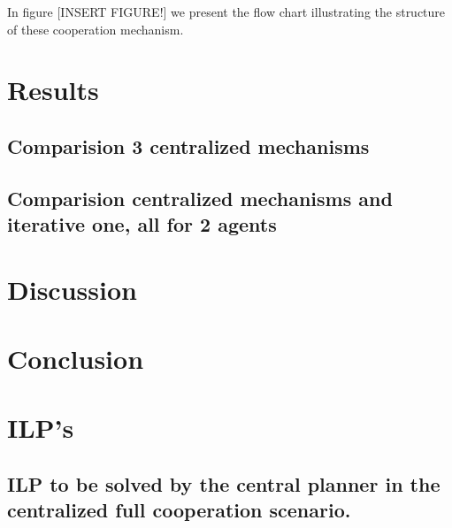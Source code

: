 \documentclass[review]{elsarticle}
\begin{document}
In figure [INSERT FIGURE!] we present the flow chart illustrating the structure of these cooperation mechanism.

\section{Results} \label{seq:results}

\subsection{Comparision 3 centralized mechanisms}

\subsection{Comparision centralized mechanisms and iterative one, all for 2 agents}

\section{Discussion} \label{seq:discussion}

\section{Conclusion} \label{seq:conclusion}




\appendix
\section{ILP's}

\subsection{ILP to be solved by the central planner in the centralized full cooperation scenario.}
\end{document}
